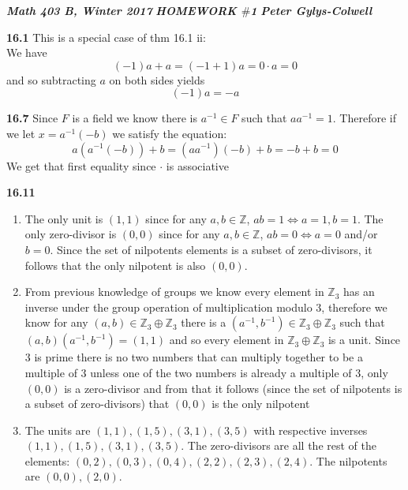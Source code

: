 \documentclass[12pt]{article}
\newenvironment{ques}{\vspace{2 ex}}{\vspace{2 ex}}
\theoremstyle{definition}
\begin{document}
\noindent \textit{\textbf{Math 403 B, Winter 2017}} \hspace{1.3cm}
\textit{\textbf{HOMEWORK $\#$1}} \hspace{1.3cm} \textit{\textbf{Peter
Gylys-Colwell}} 

\vspace{1cm}

\begin{ques}
	\textbf{16.1}
		This is a special case of thm 16.1 ii:\\
		We have 
		$$(-1)a + a = (-1 + 1)a = 0 \cdot a = 0$$
		and so subtracting $a$ on both sides yields 
		$$(-1)a = -a$$
\end{ques}

\begin{ques}
	\textbf{16.7}
		Since $F$ is a field we know there is $a^{-1} \in F$ such that
		$aa^{-1} = 1$. Therefore if we let $x = a^{-1}(-b)$ we satisfy the equation:
		$$a(a^{-1}(-b)) + b = (aa^{-1})(-b) + b = -b + b = 0$$
		We get that first equality since $\cdot$ is associative
\end{ques}

\begin{ques}
	\textbf{16.11}
		\begin{enumerate}
			\item
				The only unit is $(1,1)$ since for any $a,b \in
				\mathbb Z$, $ab = 1 \Leftrightarrow a=1, b=1$.
				The only zero-divisor is $(0,0)$ since for any
				$a,b \in \mathbb Z$, $ab = 0 \Leftrightarrow
				a=0$ and/or $b = 0$. Since the set of nilpotents
				elements is a subset of zero-divisors, it
				follows that the only nilpotent is also $(0,0)$.
			\item
				From previous knowledge of groups we know every
				element in $\mathbb Z_3$ has an inverse under
				the group operation of multiplication modulo
				$3$, therefore we know for any $(a,b) \in
				\mathbb Z_3 \oplus \mathbb Z_3$ there is a
				$(a^{-1}, b^{-1}) \in \mathbb Z_3 \oplus
				\mathbb Z_3$ such that $(a,b)(a^{-1},b^{-1}) =
				(1,1)$ and so every element in $\mathbb Z_3
				\oplus \mathbb Z_3$ is a unit. Since $3$ is
				prime there is no two numbers that can multiply
				together to be a multiple of $3$ unless one of
				the two numbers is already a multiple of $3$,
				only $(0,0)$ is a zero-divisor and
				from that it follows (since the set of
				nilpotents is a subset of zero-divisors) that
				$(0,0)$ is the only nilpotent
			\item
				The units are $(1,1), (1,5), (3,1), (3,5)$ with
				respective inverses $(1,1), (1,5), (3,1),
				(3,5)$. The zero-divisors are all the rest of
				the elements: $(0,2), (0,3), (0,4), (2,2),
				(2,3), (2,4)$. The nilpotents are $(0,0),
				(2,0)$.
		\end{enumerate}
\end{ques}
\end{document}
